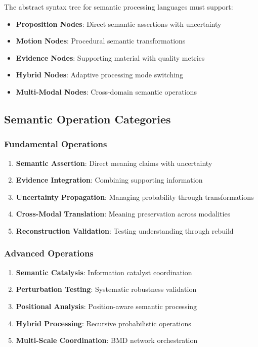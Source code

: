 \documentclass[12pt,a4paper,twoside]{article}
\begin{document}
The abstract syntax tree for semantic processing languages must support:

\begin{itemize}
\item \textbf{Proposition Nodes}: Direct semantic assertions with uncertainty
\item \textbf{Motion Nodes}: Procedural semantic transformations
\item \textbf{Evidence Nodes}: Supporting material with quality metrics
\item \textbf{Hybrid Nodes}: Adaptive processing mode switching
\item \textbf{Multi-Modal Nodes}: Cross-domain semantic operations
\end{itemize}

\subsection{Semantic Operation Categories}

\subsubsection{Fundamental Operations}

\begin{enumerate}
\item \textbf{Semantic Assertion}: Direct meaning claims with uncertainty
\item \textbf{Evidence Integration}: Combining supporting information
\item \textbf{Uncertainty Propagation}: Managing probability through transformations
\item \textbf{Cross-Modal Translation}: Meaning preservation across modalities
\item \textbf{Reconstruction Validation}: Testing understanding through rebuild
\end{enumerate}

\subsubsection{Advanced Operations}

\begin{enumerate}
\item \textbf{Semantic Catalysis}: Information catalyst coordination
\item \textbf{Perturbation Testing}: Systematic robustness validation
\item \textbf{Positional Analysis}: Position-aware semantic processing
\item \textbf{Hybrid Processing}: Recursive probabilistic operations
\item \textbf{Multi-Scale Coordination}: BMD network orchestration
\end{enumerate}
\end{document}
